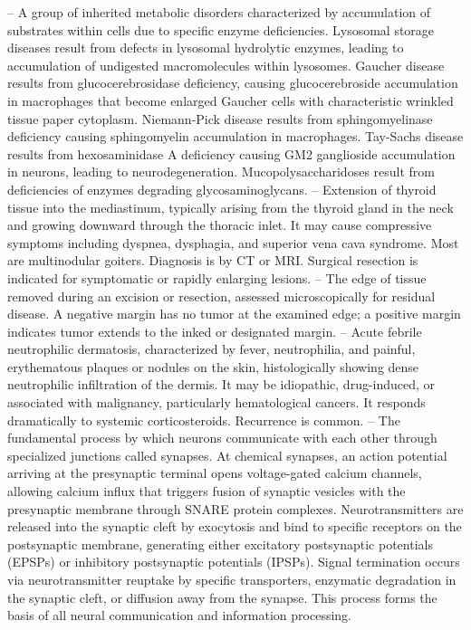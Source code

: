 -- A group of inherited metabolic disorders characterized by accumulation of substrates within cells due to specific enzyme deficiencies. Lysosomal storage diseases result from defects in lysosomal hydrolytic enzymes, leading to accumulation of undigested macromolecules within lysosomes. Gaucher disease results from glucocerebrosidase deficiency, causing glucocerebroside accumulation in macrophages that become enlarged Gaucher cells with characteristic wrinkled tissue paper cytoplasm. Niemann-Pick disease results from sphingomyelinase deficiency causing sphingomyelin accumulation in macrophages. Tay-Sachs disease results from hexosaminidase A deficiency causing GM2 ganglioside accumulation in neurons, leading to neurodegeneration. Mucopolysaccharidoses result from deficiencies of enzymes degrading glycosaminoglycans.
-- Extension of thyroid tissue into the mediastinum, typically arising from the thyroid gland in the neck and growing downward through the thoracic inlet. It may cause compressive symptoms including dyspnea, dysphagia, and superior vena cava syndrome. Most are multinodular goiters. Diagnosis is by CT or MRI. Surgical resection is indicated for symptomatic or rapidly enlarging lesions.
-- The edge of tissue removed during an excision or resection, assessed microscopically for residual disease. A negative margin has no tumor at the examined edge; a positive margin indicates tumor extends to the inked or designated margin.
-- Acute febrile neutrophilic dermatosis, characterized by fever, neutrophilia, and painful, erythematous plaques or nodules on the skin, histologically showing dense neutrophilic infiltration of the dermis. It may be idiopathic, drug-induced, or associated with malignancy, particularly hematological cancers. It responds dramatically to systemic corticosteroids. Recurrence is common.
-- The fundamental process by which neurons communicate with each other through specialized junctions called synapses. At chemical synapses, an action potential arriving at the presynaptic terminal opens voltage-gated calcium channels, allowing calcium influx that triggers fusion of synaptic vesicles with the presynaptic membrane through SNARE protein complexes. Neurotransmitters are released into the synaptic cleft by exocytosis and bind to specific receptors on the postsynaptic membrane, generating either excitatory postsynaptic potentials (EPSPs) or inhibitory postsynaptic potentials (IPSPs). Signal termination occurs via neurotransmitter reuptake by specific transporters, enzymatic degradation in the synaptic cleft, or diffusion away from the synapse. This process forms the basis of all neural communication and information processing.
